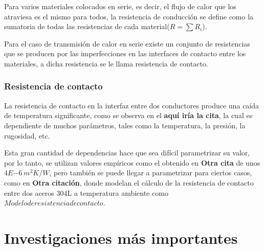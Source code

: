 Para varios materiales colocados en serie, es decir, el flujo de calor que los atraviesa es el mismo para todos, la resistencia de conducción se define como la sumatoria de todas las resistencias de cada material($R=\sum R_i$).

Para el caso de transmisión de calor en serie existe un conjunto de resistencias que se producen por las imperfecciones en las interfaces de contacto entre los materiales, a dicha resistencia se le llama resistencia de contacto.


\subsubsection{Resistencia de contacto}
La resistencia de contacto en la interfaz entre dos conductores produce una caída de temperatura significante, como se observa en el \textbf{aquí iría la cita}, la cual es dependiente de muchos parámetros, tales como la temperatura, la presión, la rugosidad, etc.

Esta gran cantidad de dependencias hace que sea difícil parametrizar su valor, por lo tanto, se utilizan valores empíricos como el obtenido en \textbf{Otra cita} de unos $4E{-6} \ m^2K/W$, pero también se puede llegar a parametrizar para ciertos casos, como en \textbf{Otra citación}, donde modelan el cálculo de la resistencia de contacto entre dos aceros 304L a temperatura ambiente como $Modelo de resistencia de contacto$.

\section{Investigaciones más importantes}


